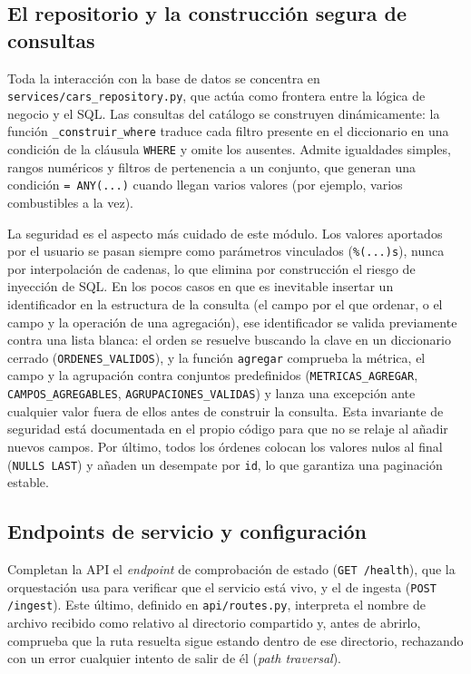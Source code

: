 \subsection{El repositorio y la construcción segura de consultas}
\label{sec:impl-backend-repositorio}

Toda la interacción con la base de datos se concentra en
\texttt{services/cars\_repository.py}, que actúa como frontera entre la lógica de
negocio y el SQL. Las consultas del catálogo se construyen dinámicamente: la
función \texttt{\_construir\_where} traduce cada filtro presente en el diccionario
en una condición de la cláusula \texttt{WHERE} y omite los ausentes. Admite
igualdades simples, rangos numéricos y filtros de pertenencia a un conjunto, que
generan una condición \texttt{= ANY(...)} cuando llegan varios valores (por
ejemplo, varios combustibles a la vez).

La seguridad es el aspecto más cuidado de este módulo. Los valores aportados por
el usuario se pasan siempre como parámetros vinculados (\texttt{\%(...)s}), nunca
por interpolación de cadenas, lo que elimina por construcción el riesgo de
inyección de SQL. En los pocos casos en que es inevitable insertar un
identificador en la estructura de la consulta (el campo por el que ordenar, o el
campo y la operación de una agregación), ese identificador se valida previamente
contra una lista blanca: el orden se resuelve buscando la clave en un diccionario
cerrado (\texttt{ORDENES\_VALIDOS}), y la función \texttt{agregar} comprueba la
métrica, el campo y la agrupación contra conjuntos predefinidos
(\texttt{METRICAS\_AGREGAR}, \texttt{CAMPOS\_AGREGABLES},
\texttt{AGRUPACIONES\_VALIDAS}) y lanza una excepción ante cualquier valor fuera de
ellos antes de construir la consulta. Esta invariante de seguridad está documentada
en el propio código para que no se relaje al añadir nuevos campos. Por último,
todos los órdenes colocan los valores nulos al final (\texttt{NULLS LAST}) y añaden
un desempate por \texttt{id}, lo que garantiza una paginación estable.

\subsection{Endpoints de servicio y configuración}
\label{sec:impl-backend-servicio}

Completan la API el \emph{endpoint} de comprobación de estado
(\texttt{GET /health}), que la orquestación usa para verificar que el servicio
está vivo, y el de ingesta (\texttt{POST /ingest}). Este último, definido en
\texttt{api/routes.py}, interpreta el nombre de archivo recibido como relativo al
directorio compartido y, antes de abrirlo, comprueba que la ruta resuelta sigue
estando dentro de ese directorio, rechazando con un error cualquier intento de
salir de él (\emph{path traversal}).

